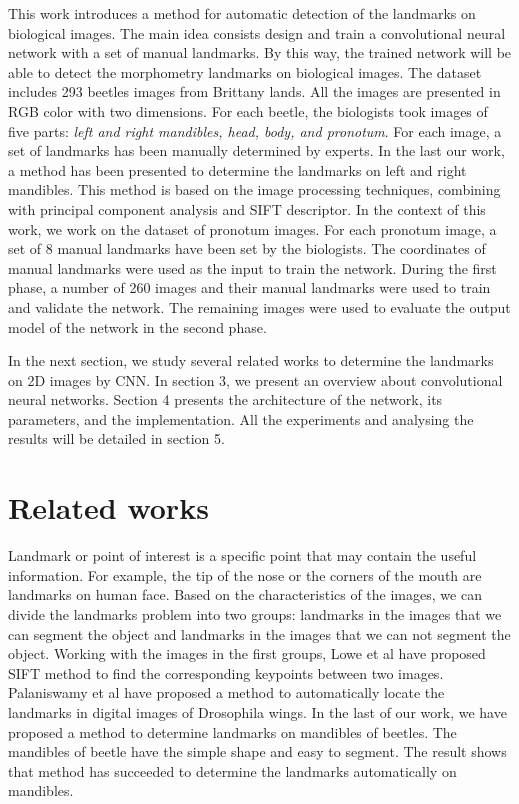 \documentclass[conference]{IEEEtran}
\begin{document}
This work introduces a method for automatic detection of the landmarks on biological images. The main idea consists design and train a convolutional neural network\cite{lecun2010convolutional} with a set of manual landmarks. By this way, the trained network will be able to detect the morphometry landmarks on biological images. The dataset includes 293 beetles images from Brittany lands. All the images are presented in RGB color with two dimensions. For each beetle, the biologists took images of five parts: \textit{left and right mandibles, head, body, and pronotum}. For each image, a set of landmarks has been manually determined by experts. In the last our work, a method has been presented to determine the landmarks on left and right mandibles\cite{le2017maelab}. This method is based on the image processing techniques\cite{canny1986computational}, combining with principal component analysis\cite{shlens2014tutorial} and SIFT descriptor\cite{lowe2004distinctive}. In the context of this work, we work on the dataset of pronotum images. For each pronotum image, a set of 8 manual landmarks have been set by the biologists. The coordinates of manual landmarks were used as the input to train the network. During the first phase, a number of 260 images and their manual landmarks were used to train and validate the network. The remaining images were used to evaluate the output model of the network in the second phase.

In the next section, we study several related works to determine the landmarks on 2D images by CNN. In section 3, we present an overview about convolutional neural networks. Section 4 presents the architecture of the network, its parameters, and the implementation. All the experiments and analysing the results will be detailed in section 5.
\section{Related works}
Landmark or point of interest is a specific point that may contain the useful information. For example, the tip of the nose or the corners of the mouth are landmarks on human face. Based on the characteristics of the images, we can divide the landmarks problem into two groups: landmarks in the images that we can segment the object and landmarks in the images that we can not segment the object. Working with the images in the first groups, Lowe et al\cite{lowe2004distinctive} have proposed SIFT method to find the corresponding keypoints between two images. Palaniswamy et al\cite{palaniswamy2010automatic} have proposed a method to automatically locate the landmarks in digital images of Drosophila wings. In the last of our work\cite{le2017maelab}, we have proposed a method to determine landmarks on mandibles of beetles. The mandibles of beetle have the simple shape and easy to segment. The result shows that method has succeeded to determine the landmarks automatically on mandibles.
\end{document}
